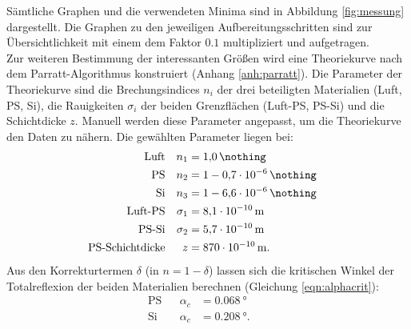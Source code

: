 Sämtliche Graphen und die verwendeten Minima sind in Abbildung \ref{fig:messung} dargestellt.
Die Graphen zu den jeweiligen Aufbereitungsschritten sind zur Übersichtlichkeit mit einem dem Faktor $0.1$ multipliziert und aufgetragen.\\
Zur weiteren Bestimmung der interessanten Größen wird eine Theoriekurve nach dem Parratt-Algorithmus konstruiert (Anhang \ref{anh:parratt}).
Die Parameter der Theoriekurve sind die Brechungsindices $n_i$ der drei beteiligten Materialien (Luft, PS, Si), die Rauigkeiten $\sigma_i$ der beiden Grenzflächen (Luft-PS, PS-Si) und die Schichtdicke $z$.
Manuell werden diese Parameter angepasst, um die Theoriekurve den Daten zu nähern.
Die gewählten Parameter liegen bei:
\begin{align*}
	\text{Luft}   			&& n_1      	&= \SI{1.0}{\nothing}			&&  \\
	\text{PS}   			&& n_2      	&= 1 -\SI{0.7e-06}{\nothing}	&&  \\
	\text{Si}  		 		&& n_3      	&= 1 -\SI{6.6e-06}{\nothing}	&&  \\
	\text{Luft-PS}   		&& \sigma_1 	&= \SI{8.1e-10}{m}				&&  \\
	\text{PS-Si}   			&& \sigma_2 	&= \SI{5.7e-10}{m}				&&  \\
	\text{PS-Schichtdicke}  && z 			&= \SI{870e-10}{m}.				&&  \\
\end{align*}
Aus den Korrekturtermen $\delta$ (in $n = 1 - \delta$) lassen sich die kritischen Winkel der Totalreflexion der beiden Materialien berechnen (Gleichung \eqref{eqn:alphacrit}):
\begin{align}
	\text{PS}	&& \alpha_c &= \SI{0.068}{°} 	&& \\
	\text{Si}	&& \alpha_c &= \SI{0.208}{°}. 	&& \\
\end{align}



